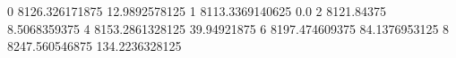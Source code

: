 0 8126.326171875 12.9892578125
1 8113.3369140625 0.0
2 8121.84375 8.5068359375
4 8153.2861328125 39.94921875
6 8197.474609375 84.1376953125
8 8247.560546875 134.2236328125
